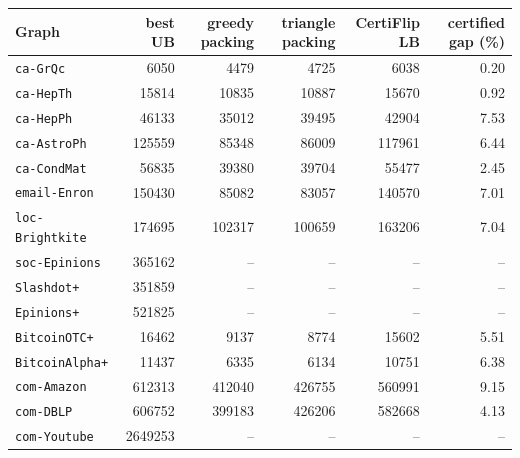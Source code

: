 \begin{tabular}{lrrrrr}
\toprule
Graph & best UB & greedy packing & triangle packing & CertiFlip LB & certified gap (\%)\\
\midrule
\texttt{ca-GrQc} & 6050 & 4479 & 4725 & 6038 & 0.20\\
\texttt{ca-HepTh} & 15814 & 10835 & 10887 & 15670 & 0.92\\
\texttt{ca-HepPh} & 46133 & 35012 & 39495 & 42904 & 7.53\\
\texttt{ca-AstroPh} & 125559 & 85348 & 86009 & 117961 & 6.44\\
\texttt{ca-CondMat} & 56835 & 39380 & 39704 & 55477 & 2.45\\
\texttt{email-Enron} & 150430 & 85082 & 83057 & 140570 & 7.01\\
\texttt{loc-Brightkite} & 174695 & 102317 & 100659 & 163206 & 7.04\\
\texttt{soc-Epinions} & 365162 & -- & -- & -- & --\\
\texttt{Slashdot+} & 351859 & -- & -- & -- & --\\
\texttt{Epinions+} & 521825 & -- & -- & -- & --\\
\texttt{BitcoinOTC+} & 16462 & 9137 & 8774 & 15602 & 5.51\\
\texttt{BitcoinAlpha+} & 11437 & 6335 & 6134 & 10751 & 6.38\\
\texttt{com-Amazon} & 612313 & 412040 & 426755 & 560991 & 9.15\\
\texttt{com-DBLP} & 606752 & 399183 & 426206 & 582668 & 4.13\\
\texttt{com-Youtube} & 2649253 & -- & -- & -- & --\\
\bottomrule
\end{tabular}
